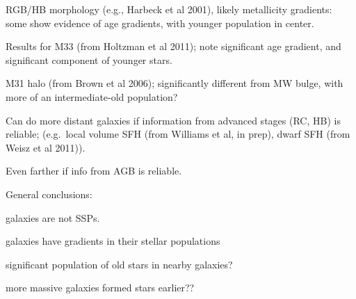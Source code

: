 \documentclass[12pt]{article}
\begin{document}
\begin{itemize*}
\begin{itemize*}
                      RGB/HB morphology (e.g., Harbeck et al 2001), likely
                      metallicity gradients: some show evidence of age gradients,
                      with younger population in center.
              \end{itemize*}
          \item Results for M33 (from Holtzman et al 2011); note significant age
              gradient, and significant component of younger stars.
          \item M31 halo (from Brown et al 2006); significantly different from
              MW bulge, with more of an intermediate-old population?
          \item Can do more distant galaxies if information from advanced stages
              (RC, HB) is reliable; (e.g.\ local volume SFH (from Williams et al,
              in prep), dwarf SFH (from Weisz et al 2011)).
          \item Even farther if info from AGB is reliable.
          \item General conclusions:
              \begin{itemize*}
                  \item galaxies are not SSPs.
                  \item galaxies have gradients in their stellar populations
                  \item significant population of old stars in nearby galaxies?
                  \item more massive galaxies formed stars earlier??
              \end{itemize*}
      \end{itemize*}
\end{document}
